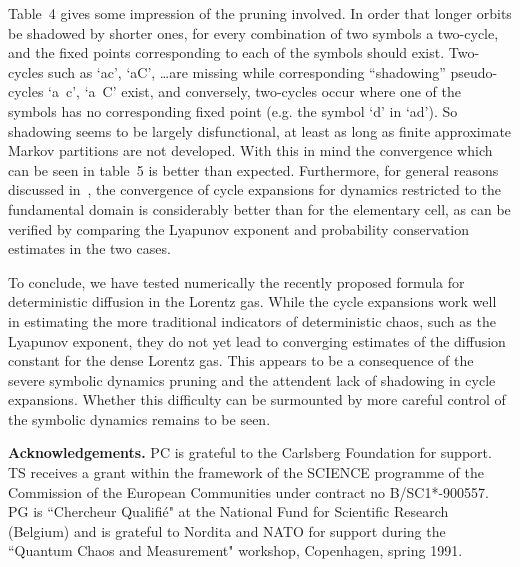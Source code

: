 Table~4 gives some impression of the pruning involved.
In order that longer orbits be shadowed by shorter ones,
for every combination of two symbols a two-cycle,
and the fixed points corresponding to each of the symbols should exist.
Two-cycles such as `ac', `aC', \ldots are missing while
corresponding ``shadowing'' pseudo-cycles `a~c', `a~C' exist, and
conversely, two-cycles occur where one of the symbols
has no corresponding fixed point
(e.g. the symbol `d' in `ad'). So shadowing seems to be largely disfunctional,
at least as long as finite approximate Markov partitions are
not developed.
With this in mind the convergence which can be seen in table~5
is better than expected. Furthermore, for general reasons discussed
in~\cite{CE2}, the convergence of cycle expansions for dynamics
restricted to the fundamental domain is considerably better
than for the elementary cell, as can be verified by comparing
the Lyapunov exponent and probability conservation estimates in
the two cases.


To conclude, we have tested numerically the recently proposed formula
for deterministic diffusion in the Lorentz gas.
While the cycle expansions work well in estimating
the more traditional indicators of deterministic chaos, such as
the Lyapunov exponent, they do not yet lead to converging estimates
of the diffusion constant for the dense Lorentz gas. This appears to
be a consequence of the severe symbolic dynamics pruning and the
attendent lack of shadowing in cycle expansions. Whether this difficulty
can be surmounted by more careful control of the symbolic dynamics
remains to be seen.

{\bf Acknowledgements.}
PC is grateful to the Carlsberg Foundation for support. TS receives a grant
within the framework of the SCIENCE programme of the Commission of the European
Communities under contract no \mbox{B/SC1*-900557}.
PG is ``Chercheur Qualifi\'e" at the National Fund for
Scientific Research (Belgium) and is grateful to Nordita and NATO for support
during the ``Quantum Chaos and Measurement" workshop, Copenhagen, spring 1991.

